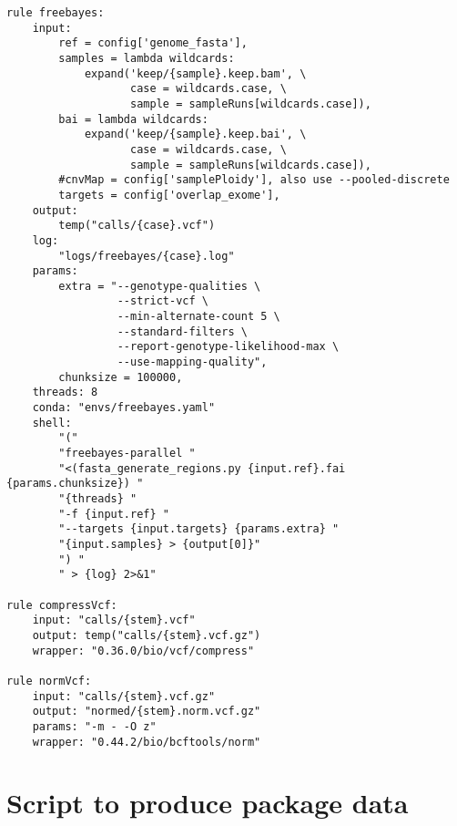 \documentclass{article}\usepackage[]{graphicx}\usepackage[]{color}
\makeatletter
\newenvironment{kframe}{%
 \def\at@end@of@kframe{}%
 \ifinner\ifhmode%
  \def\at@end@of@kframe{\end{minipage}}%
  \begin{minipage}{\columnwidth}%
 \fi\fi%
 \def\FrameCommand##1{\hskip\@totalleftmargin \hskip-\fboxsep
 \colorbox{shadecolor}{##1}\hskip-\fboxsep
     \hskip-\linewidth \hskip-\@totalleftmargin \hskip\columnwidth}%
 \MakeFramed {\advance\hsize-\width
   \@totalleftmargin\z@ \linewidth\hsize
   \@setminipage}}%
 {\par\unskip\endMakeFramed%
 \at@end@of@kframe}
\newenvironment{knitrout}{}{} %
\makeatother
\begin{document}
\begin{knitrout}
\begin{kframe}
\begin{verbatim}
rule freebayes:
    input:
        ref = config['genome_fasta'],
        samples = lambda wildcards: 
            expand('keep/{sample}.keep.bam', \
                   case = wildcards.case, \
                   sample = sampleRuns[wildcards.case]),
        bai = lambda wildcards: 
            expand('keep/{sample}.keep.bai', \
                   case = wildcards.case, \
                   sample = sampleRuns[wildcards.case]),
        #cnvMap = config['samplePloidy'], also use --pooled-discrete
        targets = config['overlap_exome'],
    output:
        temp("calls/{case}.vcf")
    log:
        "logs/freebayes/{case}.log"
    params:
        extra = "--genotype-qualities \
                 --strict-vcf \
                 --min-alternate-count 5 \
                 --standard-filters \
                 --report-genotype-likelihood-max \
                 --use-mapping-quality",
        chunksize = 100000,
    threads: 8
    conda: "envs/freebayes.yaml"
    shell:
        "(" 
        "freebayes-parallel " 
        "<(fasta_generate_regions.py {input.ref}.fai {params.chunksize}) "
        "{threads} "
        "-f {input.ref} "
        "--targets {input.targets} {params.extra} " 
        "{input.samples} > {output[0]}"
        ") "
        " > {log} 2>&1"

rule compressVcf:
    input: "calls/{stem}.vcf"
    output: temp("calls/{stem}.vcf.gz")
    wrapper: "0.36.0/bio/vcf/compress"

rule normVcf:
    input: "calls/{stem}.vcf.gz"
    output: "normed/{stem}.norm.vcf.gz"
    params: "-m - -O z"
    wrapper: "0.44.2/bio/bcftools/norm"
\end{verbatim}
\end{kframe}
\end{knitrout}

\section{Script to produce package data}
\end{document}
